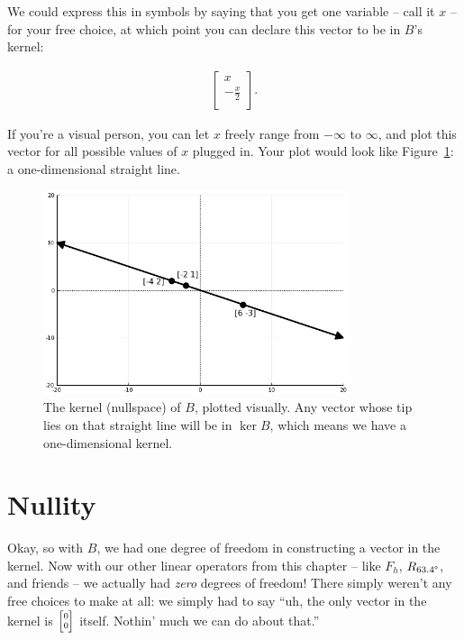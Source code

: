 We could express this in symbols by saying that you get one variable -- call it
$x$ -- for your free choice, at which point you can declare this vector to be
in $B$'s kernel:

\vspace{-.15in}
\begin{align*}
\begin{bmatrix}
x \\ -\frac{x}{2} \\
\end{bmatrix}.
\end{align*}
\vspace{-.15in}

If you're a visual person, you can let $x$ freely range from $-\infty$ to
$\infty$, and plot this vector for all possible values of $x$ plugged in. Your
plot would look like Figure~\ref{fig:nullspace1}: a one-dimensional straight
line.

\begin{figure}[ht]
\centering
\includegraphics[width=0.8\textwidth]{nullspace1.png}
\caption[.]{The kernel (nullspace) of $B$, plotted visually. Any vector whose
tip lies on that straight line will be in $\ker B$, which means we have a
one-dimensional kernel.}
\label{fig:nullspace1}
\end{figure}

\section{Nullity}

Okay, so with $B$, we had one degree of freedom in constructing a vector in the
kernel. Now with our other linear operators from this chapter -- like $F_{h}$,
$R_{63.4\degree}$, and friends -- we actually had \textit{zero} degrees of
freedom! There simply weren't any free choices to make at all: we simply had to
say ``uh, the only vector in the kernel is ${\scriptsize \begin{bmatrix} 0 \\ 0
\end{bmatrix}}$ itself. Nothin' much we can do about that.''

